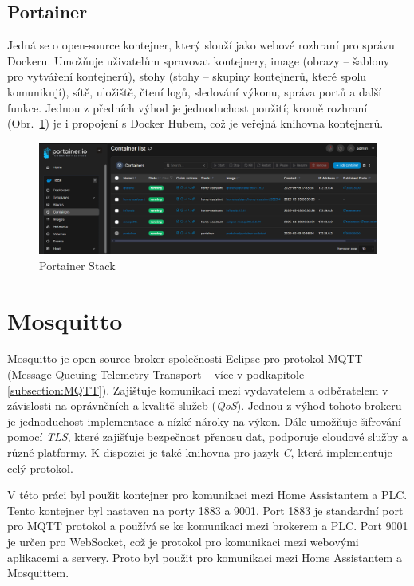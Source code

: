 \subsection{Portainer}
Jedná se o open-source kontejner, který slouží jako webové rozhraní pro správu Dockeru. Umožňuje uživatelům spravovat kontejnery, image (obrazy – šablony pro vytváření kontejnerů), 
stohy (stohy – skupiny kontejnerů, které spolu komunikují), sítě, uložiště, čtení logů, sledování výkonu, správa portů a další funkce. Jednou z předních výhod je jednoduchost použití; kromě rozhraní (Obr.~\ref{fig:portainer}) je i propojení s Docker Hubem, což je veřejná knihovna kontejnerů. \cite{Portainer} 
\begin{figure}[!ht]
  \begin{center}
  \includegraphics[scale=0.39]{obrazky/portainer.png}
  \end{center}
  \caption[Portainer Stack]{Portainer Stack}
  \label{fig:portainer}
\end{figure}
\pagebreak
\section{Mosquitto}
Mosquitto je open-source broker společnosti Eclipse pro protokol MQTT (Message Queuing Telemetry Transport – více v podkapitole \ref{subsection:MQTT}). Zajišťuje komunikaci mezi vydavatelem a odběratelem v závislosti na oprávněních a kvalitě služeb (\textit{QoS}). Jednou z výhod tohoto brokeru je jednoduchost implementace a nízké nároky na výkon. Dále umožňuje šifrování pomocí \textit{TLS}, které zajišťuje bezpečnost přenosu dat, podporuje cloudové služby a různé platformy. K dispozici je také knihovna pro jazyk \textit{C}, která implementuje celý protokol. \cite{Mosquitto}

V této práci byl použit kontejner pro komunikaci mezi Home Assistantem a PLC. Tento kontejner byl nastaven na porty 1883 a 9001. Port 1883 je standardní port pro MQTT protokol a používá se ke komunikaci mezi brokerem a PLC. Port 9001 je určen pro WebSocket, což je protokol pro komunikaci mezi webovými aplikacemi a servery. Proto byl použit pro komunikaci mezi Home Assistantem a Mosquittem.

